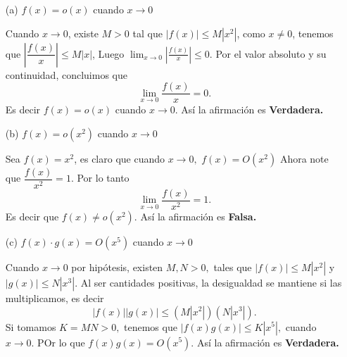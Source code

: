 \documentclass[12pt, a4paper]{article}%
\begin{document}
\begin{itemize}
    \item[(a)] \( f(x) = o(x) \) cuando \( x \to 0 \)
    \begin{solution}
        Cuando $x\to 0$, existe $M>0$ tal que $|f(x)|\leq M|x^2|$, como $x\neq 0$, tenemos que $\left|\dfrac{f(x)}{x}\right|\leq M|x|$, Luego $\displaystyle\lim_{x\to 0}\left|\frac{f(x)}{x}\right|\leq 0.$ Por el valor absoluto y su continuidad, concluimos que $$\lim_{x\to 0}\frac{f(x)}{x}= 0.$$ Es decir $f(x)=o(x)$ cuando $x\to 0.$ Así la afirmación es \textbf{Verdadera.}
    \end{solution}
    \item[(b)] \( f(x) = o(x^2) \) cuando \( x \to 0 \)
    \begin{solution}
    Sea $f(x)=x^2$, es claro que cuando $x\to 0,$ $f(x)=O(x^2)$ Ahora note que $\dfrac{f(x)}{x^2}=1.$ Por lo tanto
    $$\lim_{x\to 0}\frac{f(x)}{x^2}=1.$$
    Es decir que $f(x)\neq o(x^2).$ Así la afirmación es \textbf{Falsa.}
    \end{solution}
    \item[(c)] \( f(x) \cdot g(x) = O(x^5) \) cuando \( x \to 0 \)
    \begin{solution}
        Cuando $x\to 0$ por hipótesis, existen $M,N>0,$ tales que $|f(x)|\leq M|x^2|$ y $|g(x)|\leq N|x^3|.$ Al ser cantidades positivas, la desigualdad se mantiene si las multiplicamos, es decir
        $$|f(x)||g(x)|\leq (M|x^2|)(N|x^3|).$$
        Si tomamos $K=MN>0,$ tenemos que $|f(x)g(x)|\leq K|x^5|,$ cuando $x\to 0.$ POr lo que $f(x)g(x)=O(x^5).$ Así la afirmación es \textbf{Verdadera.}
        

\end{solution}
\end{itemize}
\end{document}
